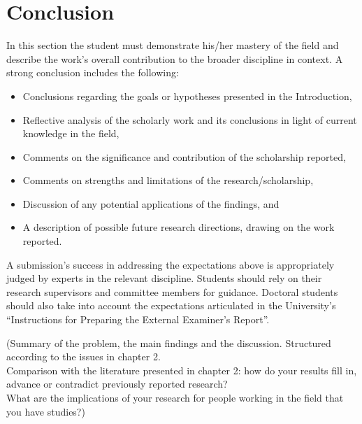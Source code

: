 \chapter{Conclusion}
  In this section the student must demonstrate his/her mastery of the field and 
    describe the work's overall contribution to the broader discipline in context. A strong 
    conclusion includes the following:
    \begin{itemize}
      \item Conclusions regarding the goals or hypotheses presented in the Introduction,
      \item Reflective analysis of the scholarly work and its conclusions in light of current 
        knowledge in the field,
      \item Comments on the significance and contribution of the scholarship reported,
      \item Comments on strengths and limitations of the research/scholarship,
      \item Discussion of any potential applications of the findings, and
      \item A description of possible future research directions, drawing on the work reported.
    \end{itemize}
    A submission's success in addressing the expectations above is appropriately judged by experts 
      in the relevant discipline. Students should rely on their research supervisors and committee 
      members for guidance. Doctoral students should also take into account the expectations 
      articulated in the University's “Instructions for Preparing the External Examiner's Report”.

  (Summary of the problem, the main findings and the discussion. Structured according to the issues 
    in chapter 2. \\
  Comparison with the literature presented in chapter 2: how do your results fill in, advance or 
    contradict previously reported research? \\
  What are the implications of your research for people working in the field that you have studies?)




